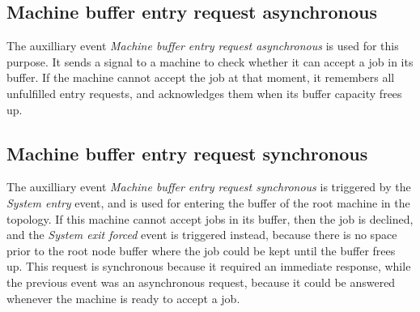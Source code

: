 \subsection{Machine buffer entry request asynchronous}
The auxilliary event \textit{Machine buffer entry request asynchronous} is used for this purpose. It sends a signal to a machine to check whether it can accept a job in its buffer. If the machine cannot accept the job at that moment, it remembers all unfulfilled entry requests, and acknowledges them when its buffer capacity frees up.

\subsection{Machine buffer entry request synchronous}
The auxilliary event \textit{Machine buffer entry request synchronous} is triggered by the \textit{System entry} event, and is used for entering the buffer of the root machine in the topology. If this machine cannot accept jobs in its buffer, then the job is declined, and the \textit{System exit forced} event is triggered instead, because there is no space prior to the root node buffer where the job could be kept until the buffer frees up. This request is synchronous because it required an immediate response, while the previous event was an asynchronous request, because it could be answered whenever the machine is ready to accept a job.

